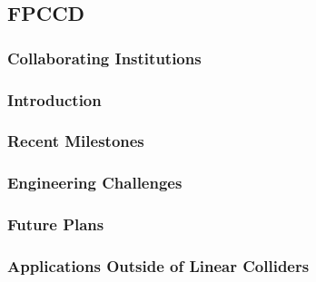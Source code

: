 \subsection{FPCCD}
\subsubsection{Collaborating Institutions}
\subsubsection{Introduction}
\subsubsection{Recent Milestones}
\subsubsection{Engineering Challenges}
\subsubsection{Future Plans}
\subsubsection{Applications Outside of Linear Colliders}
